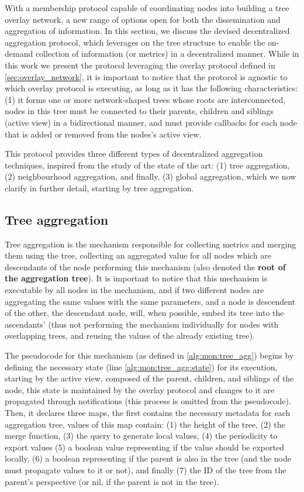
With a membership protocol capable of coordinating nodes into building a tree overlay network, a new range of options open for both the dissemination and aggregation of information. In this section, we discuss the devised decentralized aggregation protocol, which leverages on the tree structure to enable the on-demand collection of information (or metrics) in a decentralized manner. While in this work we present the protocol leveraging the overlay protocol defined in \ref{sec:overlay_network}, it is important to notice that the protocol is agnostic to which overlay protocol is executing, as long as it has the following characteristics: (1) it forms one or more network-shaped trees whose roots are interconnected, nodes in this tree must be connected to their parents, children and siblings (active view) in a bidirectional manner, and must provide callbacks for each node that is added or removed from the nodes's active view.

This protocol provides three different types of decentralized aggregation techniques, inspired from the study of the state of the art: (1) tree aggregation, (2) neighbourhood aggregation, and finally, (3) global aggregation, which we now clarify in further detail, starting by tree aggregation.

\subsection{Tree aggregation}

Tree aggregation is the mechanism responsible for collecting metrics and merging them using the tree, collecting an aggregated value for all nodes which are descendants of the node performing this mechanism (also denoted the \textbf{root of the aggregation tree}). It is important to notice that this mechanism is executable by all nodes in the mechanism, and if two different nodes are aggregating the same values with the same parameters, and a node is descendent of the other, the descendant node, will, when possible, embed its tree into the ascendants' (thus not performing the mechanism individually for nodes with overlapping trees, and reusing the values of the already existing tree).

The pseudocode for this mechanism (as defined in \ref{alg:mon:tree_agg}) begins by defining the necessary state (line \ref{alg:mon:tree_agg:state}) for its execution, starting by the active view, composed of the parent, children, and siblings of the node, this state is maintained by the overlay protocol and changes to it are propagated through notifications (this process is omitted from the pseudocode). Then, it declares three maps, the first contains the necessary metadata for each aggregation tree, values of this map contain: (1) the height of the tree, (2) the merge function, (3) the query to generate local values, (4) the periodicity to export values (5) a boolean value representing if the value should be exported locally, (6) a boolean representing if the parent is also in the tree (and the node must propagate values to it or not), and finally (7) the ID of the tree from the parent's perspective (or nil, if the parent is not in the tree).

